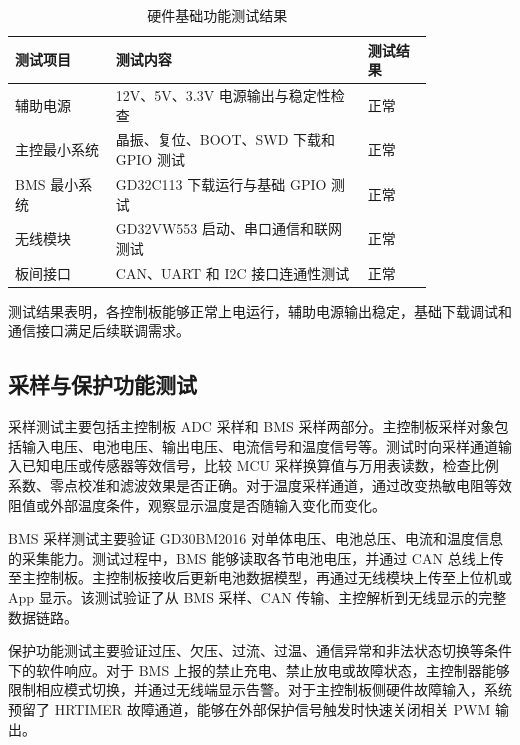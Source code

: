 \begin{table}[htbp]
  \centering
  \caption{硬件基础功能测试结果}
  \label{tab:hardware_basic_test}
  \renewcommand{\arraystretch}{1.2}
  \begin{tabular}{|m{0.20\linewidth}|m{0.50\linewidth}|m{0.13\linewidth}|}
    \hline
    \rule{0pt}{1.0cm}测试项目 & 测试内容 & 测试结果 \\
    \hline
    \rule{0pt}{1.0cm}辅助电源 & 12V、5V、3.3V 电源输出与稳定性检查 & 正常 \\
    \hline
    \rule{0pt}{1.0cm}主控最小系统 & 晶振、复位、BOOT、SWD 下载和 GPIO 测试 & 正常 \\
    \hline
    \rule{0pt}{1.0cm}BMS 最小系统 & GD32C113 下载运行与基础 GPIO 测试 & 正常 \\
    \hline
    \rule{0pt}{1.0cm}无线模块 & GD32VW553 启动、串口通信和联网测试 & 正常 \\
    \hline
    \rule{0pt}{1.0cm}板间接口 & CAN、UART 和 I2C 接口连通性测试 & 正常 \\
    \hline
  \end{tabular}
\end{table}
测试结果表明，各控制板能够正常上电运行，辅助电源输出稳定，基础下载调试和通信接口满足后续联调需求。

\subsection{采样与保护功能测试}

采样测试主要包括主控制板 ADC 采样和 BMS 采样两部分。主控制板采样对象包括输入电压、电池电压、输出电压、电流信号和温度信号等。测试时向采样通道输入已知电压或传感器等效信号，比较 MCU 采样换算值与万用表读数，检查比例系数、零点校准和滤波效果是否正确。对于温度采样通道，通过改变热敏电阻等效阻值或外部温度条件，观察显示温度是否随输入变化而变化。

BMS 采样测试主要验证 GD30BM2016 对单体电压、电池总压、电流和温度信息的采集能力。测试过程中，BMS 能够读取各节电池电压，并通过 CAN 总线上传至主控制板。主控制板接收后更新电池数据模型，再通过无线模块上传至上位机或 App 显示。该测试验证了从 BMS 采样、CAN 传输、主控解析到无线显示的完整数据链路。

保护功能测试主要验证过压、欠压、过流、过温、通信异常和非法状态切换等条件下的软件响应。对于 BMS 上报的禁止充电、禁止放电或故障状态，主控制器能够限制相应模式切换，并通过无线端显示告警。对于主控制板侧硬件故障输入，系统预留了 HRTIMER 故障通道，能够在外部保护信号触发时快速关闭相关 PWM 输出。

